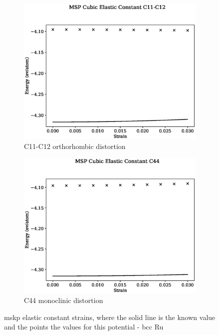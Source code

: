 \begin{figure}[htb]
\begin{subfigure}{.42\textwidth}
  \centering
  \includegraphics[width=.90\linewidth]{chapters/potentials_fe_pd_ru/feru_potential/ec_mskp/msp_c11_c12_plot_bp_0.eps}  
  \caption{C11-C12 orthorhombic distortion}
  \label{fig:fepd-fefcc-rose}
\end{subfigure}
\begin{subfigure}{.42\textwidth}
  \centering
  \includegraphics[width=.90\linewidth]{chapters/potentials_fe_pd_ru/feru_potential/ec_mskp/msp_c44_plot_bp_0.eps}  
  \caption{C44 monoclinic distortion}
  \label{fig:fepd-fefcc-bmeos}
\end{subfigure}
\label{fig:fefcc-equation-of-state}
\caption{\acrshort{mskp} elastic constant strains, where the solid line is the known value and the points the values for this potential - \acrshort{bcc} Ru}
\end{figure}







